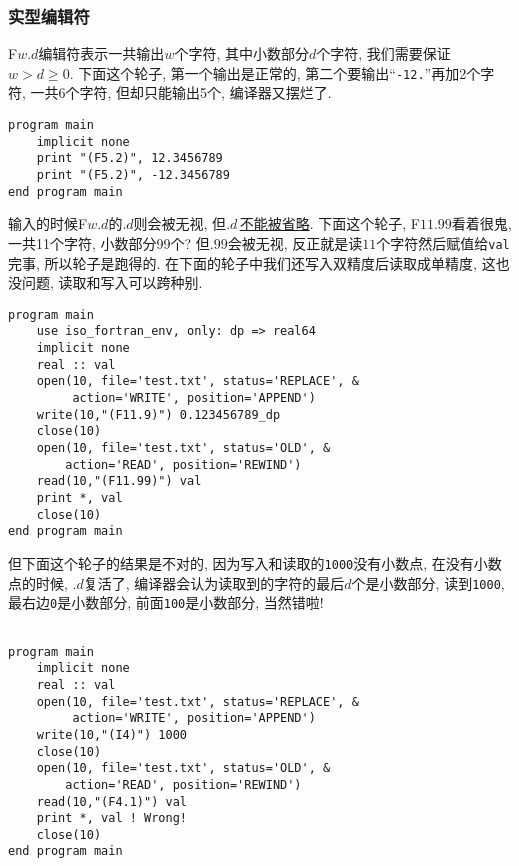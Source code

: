 \subsubsection{实型编辑符}

F$w.d$编辑符表示一共输出$w$个字符, 其中小数部分$d$个字符, 我们需要保证$w>d\geqslant0$. 下面这个轮子, 第一个输出是正常的, 第二个要输出``\texttt{-12.}''再加2个字符, 一共6个字符, 但却只能输出5个, 编译器又摆烂了.
\begin{lstlisting}
program main
    implicit none
    print "(F5.2)", 12.3456789
    print "(F5.2)", -12.3456789
end program main
\end{lstlisting}

输入的时候F$w.d$的$.d$则会被无视, 但$.d\,$\uline{不能被省略}. 下面这个轮子, F$11.99$看着很鬼, 一共11个字符, 小数部分99个? 但$.99$会被无视, 反正就是读$11$个字符然后赋值给\texttt{val}完事, 所以轮子是跑得的. 在下面的轮子中我们还写入双精度后读取成单精度, 这也没问题, 读取和写入可以跨种别.
\begin{lstlisting}
program main
    use iso_fortran_env, only: dp => real64
    implicit none
    real :: val
    open(10, file='test.txt', status='REPLACE', &
         action='WRITE', position='APPEND')
    write(10,"(F11.9)") 0.123456789_dp
    close(10)
    open(10, file='test.txt', status='OLD', &
        action='READ', position='REWIND')
    read(10,"(F11.99)") val
    print *, val
    close(10)
end program main
\end{lstlisting}
但下面这个轮子的结果是不对的, 因为写入和读取的\texttt{1000}没有小数点, 在没有小数点的时候, $.d$复活了, 编译器会认为读取到的字符的最后$d$个是小数部分, 读到\texttt{1000}, 最右边\texttt{0}是小数部分, 前面\texttt{100}是小数部分, 当然错啦!
\begin{lstlisting}

program main
    implicit none
    real :: val
    open(10, file='test.txt', status='REPLACE', &
         action='WRITE', position='APPEND')
    write(10,"(I4)") 1000
    close(10)
    open(10, file='test.txt', status='OLD', &
        action='READ', position='REWIND')
    read(10,"(F4.1)") val
    print *, val ! Wrong!
    close(10)
end program main
\end{lstlisting}

